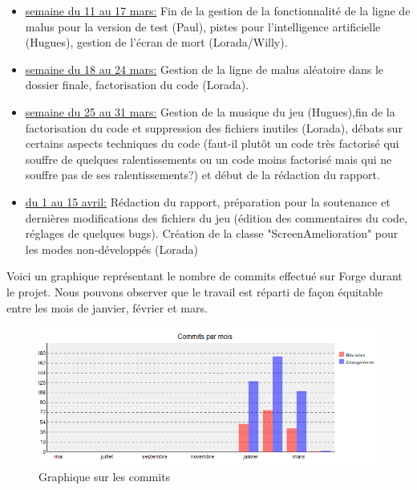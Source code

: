 \documentclass[a4paper, 11pt]{article}
\begin{document}
\begin{itemize}
            	\item \underline{semaine du 11 au 17 mars:} Fin de la gestion de la fonctionnalité de la ligne de malus pour la version de test (Paul), pistes pour l'intelligence artificielle (Hugues), gestion de l'écran de mort (Lorada/Willy).
            	\item \underline{semaine du 18 au 24 mars:} Gestion de la ligne de malus aléatoire dans le dossier finale, factorisation du code (Lorada).
            	\item \underline{semaine du 25 au 31 mars:} Gestion de la musique du jeu (Hugues),fin de la factorisation du code et suppression des fichiers inutiles (Lorada), débats sur certains aspects techniques du code (faut-il plutôt un code très factorisé qui souffre de quelques ralentissements ou un code moins factorisé mais qui ne souffre pas de ses ralentissements?) et début de la rédaction du rapport.
            	\item \underline{du 1\ier{} au 15 avril:} Rédaction du rapport, préparation pour la soutenance et dernières modifications des fichiers du jeu (édition des commentaires du code, réglages de quelques bugs). Création de la classe "ScreenAmelioration" pour les modes non-développés (Lorada)
            
            \end{itemize}
            
            Voici un graphique représentant le nombre de commits effectué sur Forge durant le projet. Nous pouvons observer que le travail est réparti de façon équitable entre les mois de janvier, février et mars.
            
            \begin{figure}[ht]
                \centering
                \includegraphics[scale=0.5]{images/Commit.png}
                \caption{Graphique sur les commits}
            \end{figure}
\end{document}

